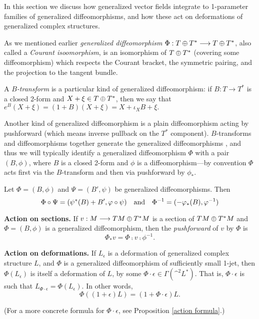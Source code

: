 \documentclass{article}
\begin{document}
In this section we discuss how generalized vector fields integrate to 1-parameter families of generalized diffeomorphisms, and how these act on deformations of generalized complex structures.

\begin{defn}\label{generalized diffeomorphism}
As we mentioned earlier \emph{generalized diffeomorphism} $\Phi : T\oplus T^* \longrightarrow T\oplus T^*$, also called a \emph{Courant isoomorphism}, is an isomorphism of $T\oplus T^*$ (covering some diffeomorphism) which respects the Courant bracket, the symmetric pairing, and the projection to the tangent bundle.

A \emph{$B$-transform} is a particular kind of generalized diffeomorphism: if $B:T\to T^*$ is a closed 2-form and $X+\xi\in T\oplus T^*$, then we say that
$e^B(X+\xi) = (1+B)(X+\xi) = X+\iota_X B+\xi.$

Another kind of generalized diffeomorphism is a plain diffeomorphism acting by pushforward (which means inverse pullback on the $T^*$ component).  $B$-transforms and diffeomorphisms together generate the generalized diffeomorphisms \cite{Gualtieri2011}, and thus we will typically identify a generalized diffeomorphism $\Phi$ with a pair $(B,\phi)$, where $B$ is a closed 2-form and $\phi$ is a diffeomorphism---by convention $\Phi$ acts first via the $B$-transform and then via pushforward by $\phi_*$.
\end{defn}

\begin{rem}\label{Courant composition}
Let $\Phi=(B,\phi)$ and $\Psi=(B',\psi)$ be generalized diffeomorphisms.  Then
$$\Phi \circ \Psi = (\psi^*(B) + B',\varphi\circ\psi)  \quad\textnormal{and}\quad
\Phi^{-1} = (-\varphi_*(B),\varphi^{-1})$$
\end{rem}

\begin{defn}\textbf{Action on sections.}\; If $v : M \longrightarrow TM \oplus T^*M$ is a section of $TM \oplus T^*M$ and $\Phi=(B,\phi)$ is a generalized diffeomorphism, then the \emph{pushforward} of $v$ by $\Phi$ is
$$\Phi_* v = \Phi \comp v \comp \phi^{-1}.$$
\end{defn}

\begin{defn}\label{generalized action on deformation}
\textbf{Action on deformations.}\; If $L_\epsilon$ is a deformation of generalized complex structure $L$, and $\Phi$ is a generalized diffeomorphism of sufficiently small 1-jet, then $\Phi(L_\epsilon)$ is itself a deformation of $L$, by some $\Phi\cdot\epsilon \in \Gamma(\^ ^2 L^*)$.  That is, $\Phi\cdot\epsilon$ is such that $L_{\Phi\cdot\epsilon} = \Phi(L_\epsilon)$.  In other words,
\begin{equation}
\Phi\left((1+\epsilon)L\right) = (1+\Phi\cdot\epsilon)L.
\end{equation}
\end{defn}
(For a more concrete formula for $\Phi\cdot\epsilon$, see Proposition \ref{action formula}.)
\end{document}
